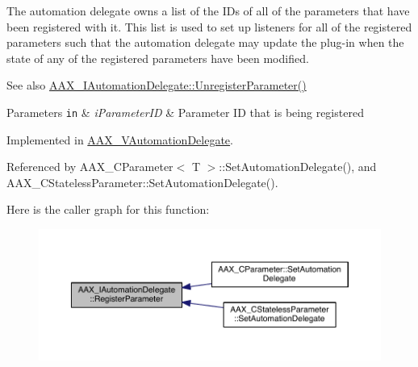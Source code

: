 The automation delegate owns a list of the I\+Ds of all of the parameters that have been registered with it. This list is used to set up listeners for all of the registered parameters such that the automation delegate may update the plug-\/in when the state of any of the registered parameters have been modified.

\begin{DoxySeeAlso}{See also}
\hyperlink{a00086_ab1c1d4292460119b22d68247150cc1a0}{A\+A\+X\+\_\+\+I\+Automation\+Delegate\+::\+Unregister\+Parameter()}
\end{DoxySeeAlso}

\begin{DoxyParams}[1]{Parameters}
\mbox{\tt in}  & {\em i\+Parameter\+I\+D} & Parameter I\+D that is being registered \\
\hline
\end{DoxyParams}


Implemented in \hyperlink{a00129_a481c2d77108aa152748ea078af53c43a}{A\+A\+X\+\_\+\+V\+Automation\+Delegate}.



Referenced by A\+A\+X\+\_\+\+C\+Parameter$<$ T $>$\+::\+Set\+Automation\+Delegate(), and A\+A\+X\+\_\+\+C\+Stateless\+Parameter\+::\+Set\+Automation\+Delegate().



Here is the caller graph for this function\+:
\nopagebreak
\begin{figure}[H]
\begin{center}
\leavevmode
\includegraphics[width=350pt]{a00086_a4d91efb2d922729d02e2ea7d7a05ed10_icgraph}
\end{center}
\end{figure}


\hypertarget{a00086_ab1c1d4292460119b22d68247150cc1a0}{}

